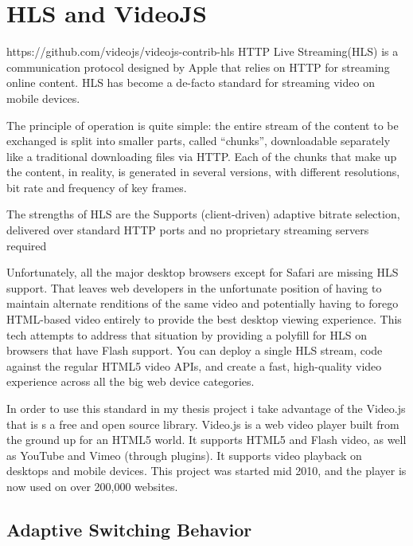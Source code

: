 \section{HLS and VideoJS}
\label{sec:HLS and VideoJS}

https://github.com/videojs/videojs-contrib-hls
HTTP Live Streaming(HLS) is a communication protocol designed by Apple that relies on HTTP for streaming online content.
HLS has become a de-facto standard for streaming video on mobile devices. 

The principle of operation is quite simple: the entire stream of the content to be exchanged is split into smaller parts, called “chunks”, downloadable separately like a traditional downloading files via HTTP.
Each of the chunks that make up the content, in reality, is generated in several versions, with different resolutions, bit rate and frequency of key frames.

The strengths of HLS are the Supports (client-driven) adaptive bitrate selection, delivered over standard HTTP ports and no proprietary streaming servers required

Unfortunately, all the major desktop browsers except for Safari are missing HLS support. That leaves web developers in the unfortunate position of having to maintain alternate renditions of the same video and potentially having to forego HTML-based video entirely to provide the best desktop viewing experience.
This tech attempts to address that situation by providing a polyfill for HLS on browsers that have Flash support. You can deploy a single HLS stream, code against the regular HTML5 video APIs, and create a fast, high-quality video experience across all the big web device categories.\cite{videojs_hls}


In order to use this standard in my thesis project i take advantage of the Video.js that is s a free and open source library.
Video.js is a web video player built from the ground up for an HTML5 world. It supports HTML5 and Flash video, as well as YouTube and Vimeo (through plugins). It supports video playback on desktops and mobile devices. This project was started mid 2010, and the player is now used on over 200,000 websites.\cite{videojs}


\subsection{Adaptive Switching Behavior}
\label{sec:Adaptive Switching Behavior}

